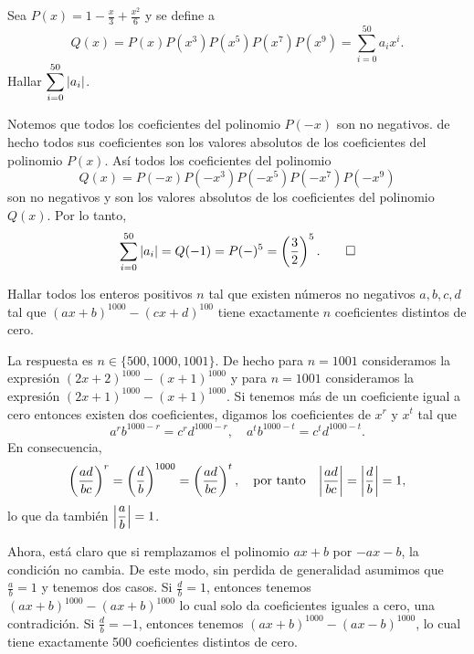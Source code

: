 \begin{example}[AIME, 2016]
    Sea $P(x) = 1 - \frac{x}{3} + \frac{x^2}{6}$ y se define a
    \[
        Q(x) = P(x)P(x^3)P(x^5)P(x^7)P(x^9) = \sum_{i = 0}^{50} a_i x^i.
    \]
    Hallar $\ds \sum_{i = 0}^{50} |a_i|$.
\end{example}
\begin{solution}
    Notemos que todos los coeficientes del polinomio $P(-x)$ son no negativos.
    de hecho todos sus coeficientes son los valores absolutos de los coeficientes del polinomio $P(x)$.
    Así todos los coeficientes del polinomio
    \[
        Q(x) = P(-x)P(- x^3)P(- x^5)P(- x^7)P(- x^9)
    \]
    son no negativos y son los valores absolutos de los coeficientes del polinomio $Q(x)$.
    Por lo tanto,
    \[
        \sum_{i = 0}^{50} |a_i| = Q(-1) = P(-)^5 = \left(\frac{3}{2}\right)^5. \qedhere
    \]
\end{solution}

\begin{example}
    Hallar todos los enteros positivos $n$ tal que existen números no negativos $a,b,c,d$ tal que $(ax + b)^{1000} - (cx + d)^{100}$ tiene exactamente $n$ coeficientes distintos de cero.
\end{example}
\begin{solution}
    La respuesta es $n \in \{500, 1000, 1001\}$.
    De hecho para $n = 1001$ consideramos la expresión $(2x + 2)^{1000} - (x + 1)^{1000}$ y para $n = 1001$ consideramos la expresión $(2x + 1)^{1000} - (x + 1)^{1000}$.
    Si tenemos más de un coeficiente igual a cero entonces existen dos coeficientes, digamos los coeficientes de $x^r$ y $x^t$ tal que
    \[
        a^r b^{1000 - r} = c^r d^{1000 - r}, \quad a^t b^{1000 - t} = c^t d^{1000 - t}.
    \]
    En consecuencia,
    \[
        \left(\frac{ad}{bc}\right)^r = \left(\frac{d}{b}\right)^{1000} = \left(\frac{ad}{bc}\right)^t, \quad \text{por tanto} \quad \abs*{\frac{ad}{bc}} = \abs*{\frac{d}{b}} = 1,
    \]
    lo que da también $\abs*{\dfrac{a}{b}} = 1$.

    Ahora, está claro que si remplazamos el polinomio $ax + b$ por $-ax - b$, la condición no cambia.
    De este modo, sin perdida de generalidad asumimos que $\frac{a}{b} = 1$ y tenemos dos casos.
    Si $\frac{d}{b} = 1$, entonces tenemos $(ax + b)^{1000} - (ax + b)^{1000}$ lo cual solo da coeficientes iguales a cero, una contradición.
    Si $\frac{d}{b} = -1$, entonces tenemos $(ax + b)^{1000} - (ax - b)^{1000}$, lo cual tiene exactamente 500 coeficientes distintos de cero.
\end{solution}

